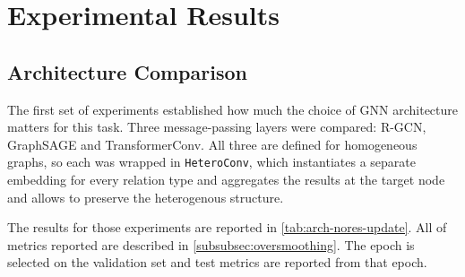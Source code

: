 \section{Experimental Results}
\label{sec:taskB-results}

\subsection{Architecture Comparison}
\label{sec:taskB-depth}

The first set of experiments established how much the choice of
GNN architecture matters for this task. Three message-passing layers were
compared: R-GCN, GraphSAGE and TransformerConv. All three are defined for
homogeneous graphs, so each was wrapped in \texttt{HeteroConv}, which
instantiates a separate embedding for every relation type and aggregates
the results at the target node and allows to preserve the heterogenous structure.

The results for those experiments are reported in \cref{tab:arch-nores-update}.
All of metrics reported are described in \cref{subsubsec:oversmoothing}.
The epoch is selected on the validation set and
test metrics are reported from that epoch.

